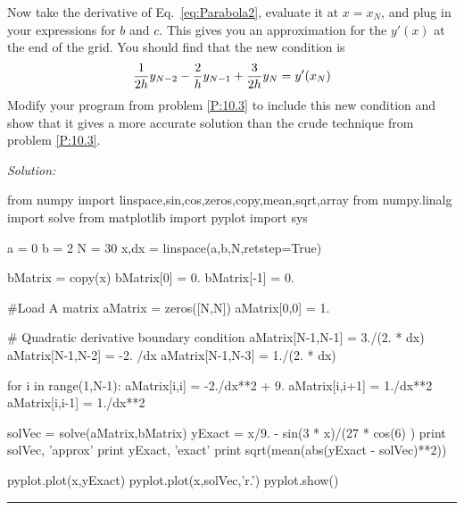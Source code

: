 \begin{enumerate}
\begin{enumerate}

\subprob Now take the derivative of Eq.~\eqref{eq:Parabola2}, evaluate
it at $x=x_N$, and plug in your expressions for $b$ and $c$. This
gives you an approximation for the $y'(x)$ at the end of the grid. You
should find that the new condition is
    \begin{equation}\label{eq:QuadBoundary}
        {1 \over 2h} y_{N-2} - {2 \over h} y_{N-1}+{3 \over 2h} y_N
        = y'(x_N)
    \end{equation}
    Modify your program from problem \ref{P:10.3} to include this
    new condition and show that it gives a more
    accurate solution than the crude technique from problem \ref{P:10.3}.

\end{enumerate}
\ifsolutions
\textit{Solution:}\\
\begin{codeexample}
\begin{VerbatimOut}{\listingFile}

from numpy import linspace,sin,cos,zeros,copy,mean,sqrt,array
from numpy.linalg import solve
from matplotlib import pyplot
import sys

a = 0
b = 2
N = 30
x,dx = linspace(a,b,N,retstep=True)

bMatrix = copy(x)
bMatrix[0] = 0.
bMatrix[-1] = 0.

#Load A matrix
aMatrix = zeros([N,N])
aMatrix[0,0] = 1.

# Quadratic derivative boundary condition
aMatrix[N-1,N-1] = 3./(2. * dx)
aMatrix[N-1,N-2] = -2. /dx
aMatrix[N-1,N-3] = 1./(2. * dx)

for i in range(1,N-1):
    aMatrix[i,i] = -2./dx**2 + 9.
    aMatrix[i,i+1] = 1./dx**2
    aMatrix[i,i-1] = 1./dx**2


solVec = solve(aMatrix,bMatrix)
yExact = x/9. - sin(3 * x)/(27 * cos(6) )
print solVec, 'approx'
print yExact, 'exact'
print sqrt(mean(abs(yExact - solVec)**2))

pyplot.plot(x,yExact)
pyplot.plot(x,solVec,'r.')
pyplot.show()
\end{VerbatimOut}
\end{codeexample}
\else
\noindent\rule{5 in}{0.01 in}
\fi

\end{enumerate}